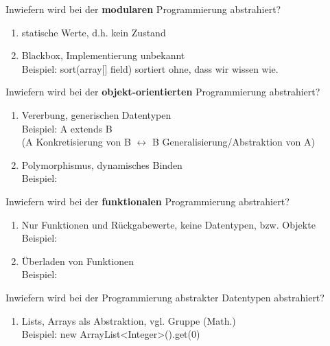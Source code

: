 \begin{card}
	Inwiefern wird bei der \textbf{modularen} Programmierung abstrahiert?
	\hr
	\begin{enumerate}
	\item statische Werte, d.h. kein Zustand
	\item Blackbox, Implementierung unbekannt\\
		Beispiel: sort(array[] field) sortiert ohne, dass wir wissen wie.
	\end{enumerate}

\end{card}

\begin{card}
	Inwiefern wird bei der \textbf{objekt-orientierten} Programmierung abstrahiert?
	\hr
	\begin{enumerate}
	\item Vererbung, generischen Datentypen\\
			Beispiel: A extends B\\
			(A Konkretisierung  von B $\leftrightarrow$ B Generalisierung/Abstraktion von A)
	\item Polymorphismus, dynamisches Binden\\
			Beispiel:
	\end{enumerate}
\end{card}

\begin{card}
	Inwiefern wird bei der \textbf{funktionalen} Programmierung abstrahiert?
	\hr
	\begin{enumerate}
	\item Nur Funktionen und Rückgabewerte, keine Datentypen, bzw. Objekte\\
		Beispiel:
	\item Überladen von Funktionen\\
		Beispiel:
	\end{enumerate}
\end{card}

\begin{card}
	Inwiefern wird bei der Programmierung abstrakter Datentypen abstrahiert?
	\hr
	\begin{enumerate}
	\item Lists, Arrays als Abstraktion, vgl. Gruppe (Math.)\\
		Beispiel: new ArrayList<Integer>().get(0)
	\end{enumerate}
\end{card}

